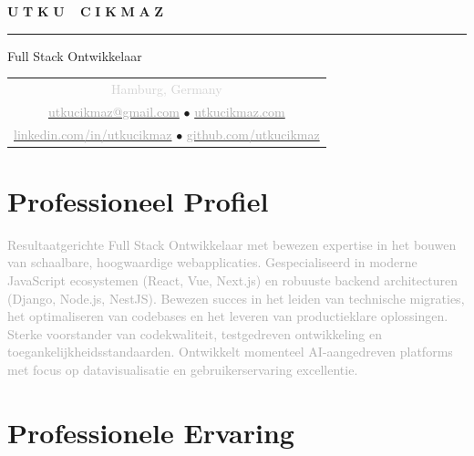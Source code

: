 \documentclass[10pt,a4paper]{article}
\newcommand{\gradientname}[1]{%
  \textcolor{darkgray!90}{\Huge\bfseries U}%
  \textcolor{darkgray!80}{\Huge\bfseries T}%
  \textcolor{darkgray!70}{\Huge\bfseries K}%
  \textcolor{darkgray!60}{\Huge\bfseries U}%
  \textcolor{mediumgray!90}{\Huge\bfseries\ }%
  \textcolor{mediumgray!80}{\Huge\bfseries C}%
  \textcolor{mediumgray!70}{\Huge\bfseries I}%
  \textcolor{mediumgray!60}{\Huge\bfseries K}%
  \textcolor{mediumgray!50}{\Huge\bfseries M}%
  \textcolor{lightgray!80}{\Huge\bfseries A}%
  \textcolor{lightgray!70}{\Huge\bfseries Z}%
}
\begin{document}
\color{black}
\pagestyle{empty}

\begin{center}
  \vspace{-3pt}
  \gradientname{UTKU CIKMAZ}
  
  \vspace{4pt}
  \textcolor{verylightgray}{\rule{0.35\textwidth}{0.6pt}}
  
  \vspace{4pt}
  {\large\color{mediumgray}Full Stack Ontwikkelaar}
  
  \vspace{5pt}
  \begin{tabular}{c}
    \textcolor{lightgray}{\small Hamburg, Germany} \\[2pt]
    \href{mailto:utkucikmaz@gmail.com}{\textcolor{darkgray}{utkucikmaz@gmail.com}} \quad
    \textcolor{verylightgray}{$\bullet$} \quad
    \href{https://www.utkucikmaz.com}{\textcolor{darkgray}{utkucikmaz.com}} \\[1pt]
    \href{https://linkedin.com/in/utkucikmaz}{\textcolor{darkgray}{linkedin.com/in/utkucikmaz}} \quad
    \textcolor{verylightgray}{$\bullet$} \quad
    \href{https://github.com/utkucikmaz}{\textcolor{darkgray}{github.com/utkucikmaz}}
  \end{tabular}
\end{center}

\vspace{1pt}

\section*{Professioneel Profiel}
\vspace{0pt}
\textcolor{darkgray}{%
Resultaatgerichte Full Stack Ontwikkelaar met bewezen expertise in het bouwen van schaalbare, hoogwaardige webapplicaties. Gespecialiseerd in moderne JavaScript ecosystemen (React, Vue, Next.js) en robuuste backend architecturen (Django, Node.js, NestJS). Bewezen succes in het leiden van technische migraties, het optimaliseren van codebases en het leveren van productieklare oplossingen. Sterke voorstander van codekwaliteit, testgedreven ontwikkeling en toegankelijkheidsstandaarden. Ontwikkelt momenteel AI-aangedreven platforms met focus op datavisualisatie en gebruikerservaring excellentie.
}
\vspace{1pt}

\section*{Professionele Ervaring}
\end{document}
